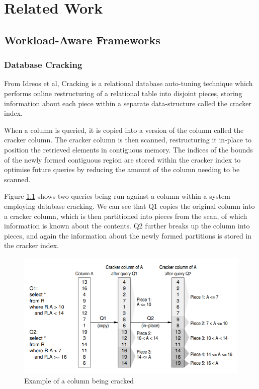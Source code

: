 \chapter{Related Work}

\label{ch:relatedwork}

\section{Workload-Aware Frameworks}

\subsection{Database Cracking}

From Idreos et al, Cracking is a relational database auto-tuning technique which performs online restructuring of a relational table into disjoint pieces, storing information about each piece within a separate data-structure called the cracker index.

When a column is queried, it is copied into a version of the column called the cracker column. The cracker column is then scanned, restructuring it in-place to position the retrieved elements in contiguous memory. The indices of the bounds of the newly formed contiguous region are stored within the cracker index to optimise future queries by reducing the amount of the column needing to be scanned.

Figure \ref{fig:cracking_img} shows two queries being run against a column within a system employing database cracking. We can see that Q1 copies the original column into a cracker column, which is then partitioned into pieces from the scan, of which information is known about the contents. Q2 further breaks up the column into pieces, and again the information about the newly formed partitions is stored in the cracker index.

\begin{figure}[h]
  \includegraphics[width=\textwidth]{cracking_img}
  \caption{Example of a column being cracked}
  \label{fig:cracking_img}
\end{figure}

